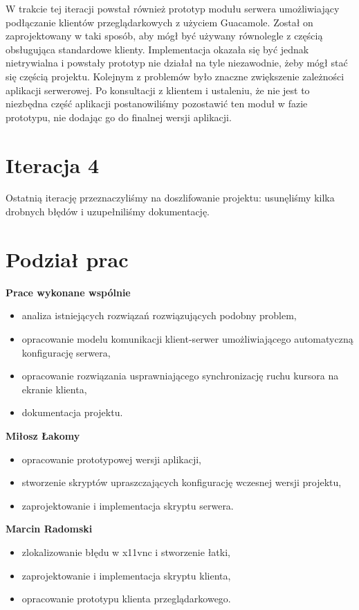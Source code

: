     W trakcie tej iteracji powstał również prototyp modułu serwera umożliwiający podłączanie klientów przeglądarkowych z użyciem Guacamole. Został on zaprojektowany w taki sposób, aby mógł być używany równolegle z częścią obsługująca standardowe  klienty. Implementacja okazała się być jednak nietrywialna i powstały prototyp nie działał na tyle niezawodnie, żeby mógł stać się częścią projektu. Kolejnym z problemów było znaczne zwiększenie zależności aplikacji serwerowej. Po konsultacji z klientem i ustaleniu, że nie jest to niezbędna część aplikacji postanowiliśmy pozostawić ten moduł w fazie prototypu, nie dodając go do finalnej wersji aplikacji.

\section{Iteracja 4}

  Ostatnią iterację przeznaczyliśmy na doszlifowanie projektu: usunęliśmy kilka drobnych błędów i uzupełniliśmy dokumentację.

\section{Podział prac}

  \textbf{Prace wykonane wspólnie}
  \begin{itemize}[noitemsep]
    \item analiza istniejących rozwiązań rozwiązujących podobny problem,
    \item opracowanie modelu komunikacji klient-serwer umożliwiającego automatyczną konfigurację serwera,
    \item opracowanie rozwiązania usprawniającego synchronizację ruchu kursora na ekranie klienta,
    \item dokumentacja projektu.
  \end{itemize}

  \noindent
  \textbf{Miłosz Łakomy}
  \begin{itemize}[noitemsep]
    \item opracowanie prototypowej wersji aplikacji,
    \item stworzenie skryptów upraszczających konfigurację wczesnej wersji projektu,
    \item zaprojektowanie i implementacja skryptu serwera.
  \end{itemize}

  \noindent
  \textbf{Marcin Radomski}
  \begin{itemize}[noitemsep]
    \item zlokalizowanie błędu w x11vnc i stworzenie łatki,
    \item zaprojektowanie i implementacja skryptu klienta,
    \item opracowanie prototypu klienta przeglądarkowego.
  \end{itemize}

